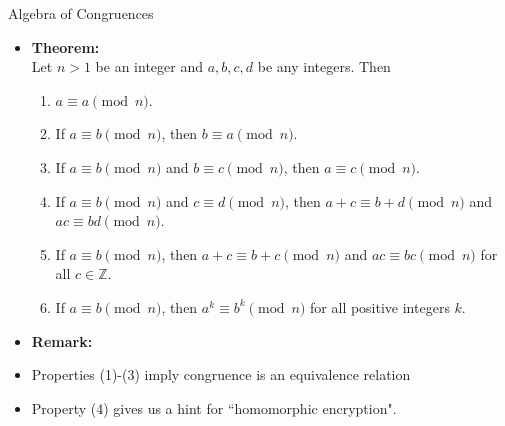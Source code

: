 \documentclass[ %
 usenames,dvipsnames,
aspectratio=169,11pt ]{beamer}
\newenvironment{stepitemize}{\begin{itemize}[<+->]}{\end{itemize} }
\newcommand{\Z}{\mathbb{Z}}
\begin{document}
\begin{frame}{Algebra of Congruences}
\begin{stepitemize}

\item[]{\bf Theorem:}\\
Let $n>1$ be an integer and $a, b, c, d$ be any integers. Then

\begin{enumerate}
    \item $a\equiv a \pmod{n}$.
    \item If $a\equiv b \pmod{n}$, then $b\equiv a \pmod{n}$.
    \item If $a\equiv b \pmod{n}$ and $b\equiv c \pmod{n}$, then $a\equiv c \pmod{n}$.
    \item If $a\equiv b \pmod{n}$ and $c\equiv d \pmod{n}$, then $a+c\equiv b+d \pmod{n}$ and $ac\equiv bd \pmod{n}$.
    \item If $a\equiv b \pmod{n}$, then $a+c\equiv b+c \pmod{n}$ and $ac\equiv bc \pmod{n}$ for all $c\in \Z$.
    \item If $a\equiv b \pmod{n}$, then $a^k \equiv b^k \pmod{n}$ for all positive integers $k$.
\end{enumerate}

\medskip
\item {\bf Remark:}
    \item Properties (1)-(3) imply congruence is an equivalence relation
    \item Property (4) gives us a hint for ``homomorphic encryption".
\end{stepitemize}
\end{frame}
\end{document}
